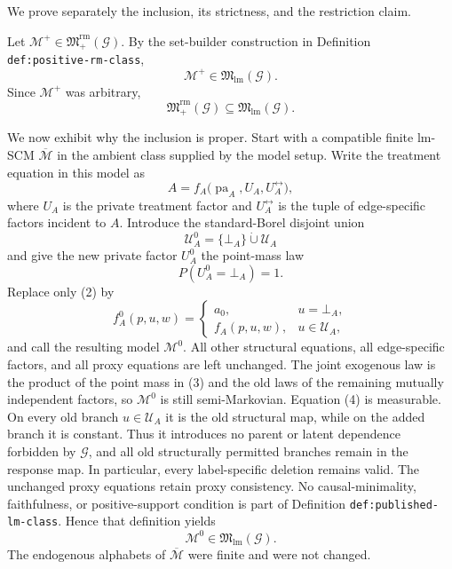 We prove separately the inclusion, its strictness, and the restriction claim.

Let \(\mathcal M^{+}\in\mathfrak M_{+}^{\mathrm{rm}}(\mathcal G)\).  By the set-builder construction in Definition \texttt{def:positive-rm-class},
\[
\mathcal M^{+}\in\mathfrak M_{\mathrm{lm}}(\mathcal G).
\]
Since \(\mathcal M^{+}\) was arbitrary,
\[
\mathfrak M_{+}^{\mathrm{rm}}(\mathcal G)
\subseteq
\mathfrak M_{\mathrm{lm}}(\mathcal G).
\tag{1}
\]

We now exhibit why the inclusion is proper.  Start with a compatible finite lm-SCM \(\overline{\mathcal M}\) in the ambient class supplied by the model setup.  Write the treatment equation in this model as
\[
A=f_A\bigl(\operatorname{pa}_A,U_A,U_A^{\leftrightarrow}\bigr),
\tag{2}
\]
where \(U_A\) is the private treatment factor and \(U_A^{\leftrightarrow}\) is the tuple of edge-specific factors incident to \(A\).  Introduce the standard-Borel disjoint union
\[
\mathcal U_A^{0}=\{\bot_A\}\mathbin{\dot\cup}\mathcal U_A
\]
and give the new private factor \(U_A^{0}\) the point-mass law
\[
P(U_A^{0}=\bot_A)=1.
\tag{3}
\]
Replace only (2) by
\[
f_A^{0}(p,u,w)=
\begin{cases}
a_0,&u=\bot_A,\\
f_A(p,u,w),&u\in\mathcal U_A,
\end{cases}
\tag{4}
\]
and call the resulting model \(\mathcal M^{0}\).  All other structural equations, all edge-specific factors, and all proxy equations are left unchanged.  The joint exogenous law is the product of the point mass in (3) and the old laws of the remaining mutually independent factors, so \(\mathcal M^{0}\) is still semi-Markovian.  Equation (4) is measurable.  On every old branch \(u\in\mathcal U_A\) it is the old structural map, while on the added branch it is constant.  Thus it introduces no parent or latent dependence forbidden by \(\mathcal G\), and all old structurally permitted branches remain in the response map.  In particular, every label-specific deletion remains valid.  The unchanged proxy equations retain proxy consistency.  No causal-minimality, faithfulness, or positive-support condition is part of Definition \texttt{def:published-lm-class}.  Hence that definition yields
\[
\mathcal M^{0}\in\mathfrak M_{\mathrm{lm}}(\mathcal G).
\tag{5}
\]
The endogenous alphabets of \(\overline{\mathcal M}\) were finite and were not changed.

